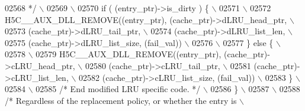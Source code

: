 \begin{DoxyCode}
02568 \textcolor{comment}{         */}\textcolor{preprocessor}{                                                               \(\backslash\)}
02569 \textcolor{preprocessor}{                                                                          \(\backslash\)}
02570 \textcolor{preprocessor}{        if ( (entry\_ptr)->is\_dirty ) \{                                    \(\backslash\)}
02571 \textcolor{preprocessor}{                                                                          \(\backslash\)}
02572 \textcolor{preprocessor}{            H5C\_\_AUX\_DLL\_REMOVE((entry\_ptr), (cache\_ptr)->dLRU\_head\_ptr,  \(\backslash\)}
02573 \textcolor{preprocessor}{                                (cache\_ptr)->dLRU\_tail\_ptr,               \(\backslash\)}
02574 \textcolor{preprocessor}{                                (cache\_ptr)->dLRU\_list\_len,               \(\backslash\)}
02575 \textcolor{preprocessor}{                                (cache\_ptr)->dLRU\_list\_size, (fail\_val))  \(\backslash\)}
02576 \textcolor{preprocessor}{                                                                          \(\backslash\)}
02577 \textcolor{preprocessor}{        \} else \{                                                          \(\backslash\)}
02578 \textcolor{preprocessor}{                                                                          \(\backslash\)}
02579 \textcolor{preprocessor}{            H5C\_\_AUX\_DLL\_REMOVE((entry\_ptr), (cache\_ptr)->cLRU\_head\_ptr,  \(\backslash\)}
02580 \textcolor{preprocessor}{                                (cache\_ptr)->cLRU\_tail\_ptr,               \(\backslash\)}
02581 \textcolor{preprocessor}{                                (cache\_ptr)->cLRU\_list\_len,               \(\backslash\)}
02582 \textcolor{preprocessor}{                                (cache\_ptr)->cLRU\_list\_size, (fail\_val))  \(\backslash\)}
02583 \textcolor{preprocessor}{        \}                                                                 \(\backslash\)}
02584 \textcolor{preprocessor}{                                                                          \(\backslash\)}
02585 \textcolor{preprocessor}{        }\textcolor{comment}{/* End modified LRU specific code. */}\textcolor{preprocessor}{                             \(\backslash\)}
02586 \textcolor{preprocessor}{    \}                                                                     \(\backslash\)}
02587 \textcolor{preprocessor}{                                                                          \(\backslash\)}
02588 \textcolor{preprocessor}{    }\textcolor{comment}{/* Regardless of the replacement policy, or whether the entry is      \(\backslash\)}

\end{DoxyCode}
